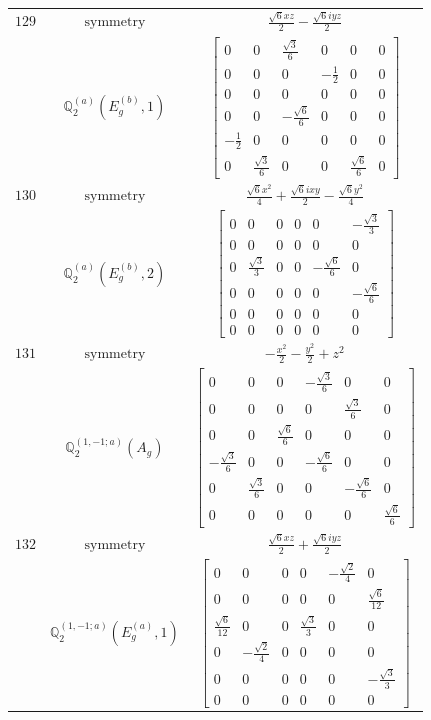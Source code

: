 \documentclass[fleqn,8pt,landscape]{jsarticle}
\begin{document}
\begin{longtable}{ccc}
$ 129 $ & $ \text{symmetry} $ & $ \frac{\sqrt{6} x z}{2} - \frac{\sqrt{6} i y z}{2} $ \\
$  $ & $ \mathbb{Q}_{2}^{(a)}(E_{g}^{(b)},1) $ & $ \begin{bmatrix} 0 & 0 & \frac{\sqrt{3}}{6} & 0 & 0 & 0 \\ 0 & 0 & 0 & - \frac{1}{2} & 0 & 0 \\ 0 & 0 & 0 & 0 & 0 & 0 \\ 0 & 0 & - \frac{\sqrt{6}}{6} & 0 & 0 & 0 \\ - \frac{1}{2} & 0 & 0 & 0 & 0 & 0 \\ 0 & \frac{\sqrt{3}}{6} & 0 & 0 & \frac{\sqrt{6}}{6} & 0 \end{bmatrix} $ \\ \hline
$ 130 $ & $ \text{symmetry} $ & $ \frac{\sqrt{6} x^{2}}{4} + \frac{\sqrt{6} i x y}{2} - \frac{\sqrt{6} y^{2}}{4} $ \\
$  $ & $ \mathbb{Q}_{2}^{(a)}(E_{g}^{(b)},2) $ & $ \begin{bmatrix} 0 & 0 & 0 & 0 & 0 & - \frac{\sqrt{3}}{3} \\ 0 & 0 & 0 & 0 & 0 & 0 \\ 0 & \frac{\sqrt{3}}{3} & 0 & 0 & - \frac{\sqrt{6}}{6} & 0 \\ 0 & 0 & 0 & 0 & 0 & - \frac{\sqrt{6}}{6} \\ 0 & 0 & 0 & 0 & 0 & 0 \\ 0 & 0 & 0 & 0 & 0 & 0 \end{bmatrix} $ \\ \hline
$ 131 $ & $ \text{symmetry} $ & $ - \frac{x^{2}}{2} - \frac{y^{2}}{2} + z^{2} $ \\
$  $ & $ \mathbb{Q}_{2}^{(1,-1;a)}(A_{g}) $ & $ \begin{bmatrix} 0 & 0 & 0 & - \frac{\sqrt{3}}{6} & 0 & 0 \\ 0 & 0 & 0 & 0 & \frac{\sqrt{3}}{6} & 0 \\ 0 & 0 & \frac{\sqrt{6}}{6} & 0 & 0 & 0 \\ - \frac{\sqrt{3}}{6} & 0 & 0 & - \frac{\sqrt{6}}{6} & 0 & 0 \\ 0 & \frac{\sqrt{3}}{6} & 0 & 0 & - \frac{\sqrt{6}}{6} & 0 \\ 0 & 0 & 0 & 0 & 0 & \frac{\sqrt{6}}{6} \end{bmatrix} $ \\ \hline
$ 132 $ & $ \text{symmetry} $ & $ \frac{\sqrt{6} x z}{2} + \frac{\sqrt{6} i y z}{2} $ \\
$  $ & $ \mathbb{Q}_{2}^{(1,-1;a)}(E_{g}^{(a)},1) $ & $ \begin{bmatrix} 0 & 0 & 0 & 0 & - \frac{\sqrt{2}}{4} & 0 \\ 0 & 0 & 0 & 0 & 0 & \frac{\sqrt{6}}{12} \\ \frac{\sqrt{6}}{12} & 0 & 0 & \frac{\sqrt{3}}{3} & 0 & 0 \\ 0 & - \frac{\sqrt{2}}{4} & 0 & 0 & 0 & 0 \\ 0 & 0 & 0 & 0 & 0 & - \frac{\sqrt{3}}{3} \\ 0 & 0 & 0 & 0 & 0 & 0 \end{bmatrix} $ \\ \hline

\end{longtable}
\end{document}
